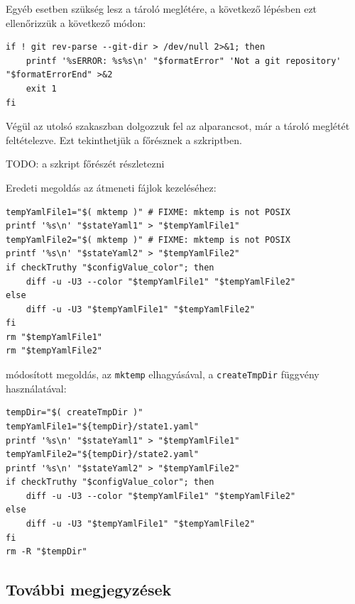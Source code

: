 \documentclass[
]{elteikthesis}[2025/03/25]
\begin{document}
Egyéb esetben szükség lesz a tároló meglétére,
a következő lépésben ezt ellenőrizzük a következő módon:

\begin{listing}[H]
\begin{verbatim}
if ! git rev-parse --git-dir > /dev/null 2>&1; then
    printf '%sERROR: %s%s\n' "$formatError" 'Not a git repository' "$formatErrorEnd" >&2
    exit 1
fi
\end{verbatim}
\caption{Git tároló meglétének ellenőrzése}
\end{listing}

Végül az utolsó szakaszban dolgozzuk fel az alparancsot, már a tároló meglétét feltételezve.
Ezt tekinthetjük a főrésznek a szkriptben.

TODO: a szkript főrészét részletezni

Eredeti megoldás az átmeneti fájlok kezeléséhez:

\begin{listing}[H]
\begin{verbatim}
tempYamlFile1="$( mktemp )" # FIXME: mktemp is not POSIX
printf '%s\n' "$stateYaml1" > "$tempYamlFile1"
tempYamlFile2="$( mktemp )" # FIXME: mktemp is not POSIX
printf '%s\n' "$stateYaml2" > "$tempYamlFile2"
if checkTruthy "$configValue_color"; then
    diff -u -U3 --color "$tempYamlFile1" "$tempYamlFile2"
else
    diff -u -U3 "$tempYamlFile1" "$tempYamlFile2"
fi
rm "$tempYamlFile1"
rm "$tempYamlFile2"
\end{verbatim}
\caption{Átmeneti fájlok kezelése előtte}
\end{listing}

módosított megoldás, az \verb|mktemp| elhagyásával, a \verb|createTmpDir| függvény használatával:

\begin{listing}[H]
\begin{verbatim}
tempDir="$( createTmpDir )"
tempYamlFile1="${tempDir}/state1.yaml"
printf '%s\n' "$stateYaml1" > "$tempYamlFile1"
tempYamlFile2="${tempDir}/state2.yaml"
printf '%s\n' "$stateYaml2" > "$tempYamlFile2"
if checkTruthy "$configValue_color"; then
    diff -u -U3 --color "$tempYamlFile1" "$tempYamlFile2"
else
    diff -u -U3 "$tempYamlFile1" "$tempYamlFile2"
fi
rm -R "$tempDir"
\end{verbatim}
\caption{Átmeneti fájlok kezelése utána}
\end{listing}

\subsection{További megjegyzések}
\end{document}
